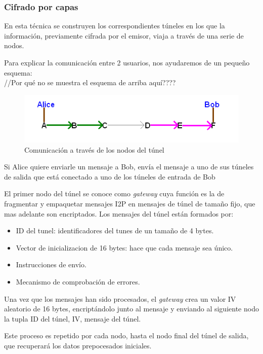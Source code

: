 \subsubsection*{Cifrado por capas}

En esta técnica se construyen los correspondientes túneles en los que la información, previamente cifrada por el emisor,  viaja a través de una serie de nodos.

Para explicar la comunicación entre 2 usuarios, nos ayudaremos de un pequeño esquema: \\

//Por qué no se muestra el esquema de arriba aquí???? \\

	
\begin{figure}
	\centering
	\includegraphics[width=.8\textwidth]{img/alice_bob_tunnel}
	\caption{Comunicación a través de los nodos del túnel}
\end{figure}

Si Alice quiere enviarle un mensaje a Bob, envía el mensaje a uno de sus túneles de salida que está conectado a uno de los túneles de entrada de Bob


El primer nodo del túnel se conoce como \textit{gateway} cuya función es la de fragmentar y empaquetar mensajes I2P en mensajes de túnel de tamaño fijo, que mas adelante son encriptados. 
Los mensajes del túnel están formados por:

\begin{itemize}
	\item ID del tunel: identificadores del tunes de un tamaño de 4 bytes.
	\item Vector de inicializacion de 16 bytes: hace que cada mensaje sea único.
	\item Instrucciones de envío.
	\item Mecanismo de comprobación de errores.
\end{itemize}

Una vez que los mensajes han sido procesados, el \textit{gateway} crea un valor IV aleatorio de 16 bytes, encriptándolo junto al mensaje y enviando al siguiente nodo la tupla {ID del túnel, IV, mensaje del túnel}. 

Este proceso es repetido por cada nodo, hasta el nodo final del túnel de salida, que recuperará los datos prepocesados iniciales.



